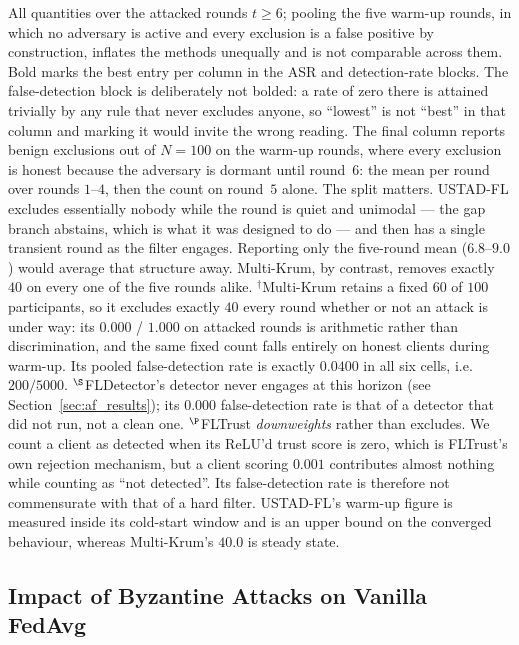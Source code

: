 \documentclass[journal]{IEEEtran}
\begin{document}
\begin{table}[!t]
\vspace{2pt}
{\footnotesize \raggedright All quantities over the attacked rounds $t \ge 6$; pooling the five warm-up rounds, in which no adversary is active and every exclusion is a false positive by construction, inflates the methods unequally and is not comparable across them. Bold marks the best entry per column in the ASR and detection-rate blocks. The false-detection block is deliberately not bolded: a rate of zero there is attained trivially by any rule that never excludes anyone, so ``lowest'' is not ``best'' in that column and marking it would invite the wrong reading. The final column reports benign exclusions out of $N=100$ on the warm-up rounds, where every exclusion is honest because the adversary is dormant until round~$6$: the mean per round over rounds $1$--$4$, then the count on round~$5$ alone. The split matters. USTAD-FL excludes essentially nobody while the round is quiet and unimodal --- the gap branch abstains, which is what it was designed to do --- and then has a single transient round as the filter engages. Reporting only the five-round mean ($6.8$--$9.0$) would average that structure away. Multi-Krum, by contrast, removes exactly $40$ on every one of the five rounds alike. $^\dagger$Multi-Krum retains a fixed $60$ of $100$ participants, so it excludes exactly $40$ every round whether or not an attack is under way: its $0.000$ / $1.000$ on attacked rounds is arithmetic rather than discrimination, and the same fixed count falls entirely on honest clients during warm-up. Its pooled false-detection rate is exactly $0.0400$ in all six cells, i.e.\ $200/5000$. $^{\S}$FLDetector's detector never engages at this horizon (see Section~\ref{sec:af_results}); its $0.000$ false-detection rate is that of a detector that did not run, not a clean one. $^{\P}$FLTrust \emph{downweights} rather than excludes. We count a client as detected when its ReLU'd trust score is zero, which is FLTrust's own rejection mechanism, but a client scoring $0.001$ contributes almost nothing while counting as ``not detected''. Its false-detection rate is therefore not commensurate with that of a hard filter. USTAD-FL's warm-up figure is measured inside its cold-start window and is an upper bound on the converged behaviour, whereas Multi-Krum's $40.0$ is steady state.\par}
\end{table}

\subsection{Impact of Byzantine Attacks on Vanilla FedAvg}
\end{document}
